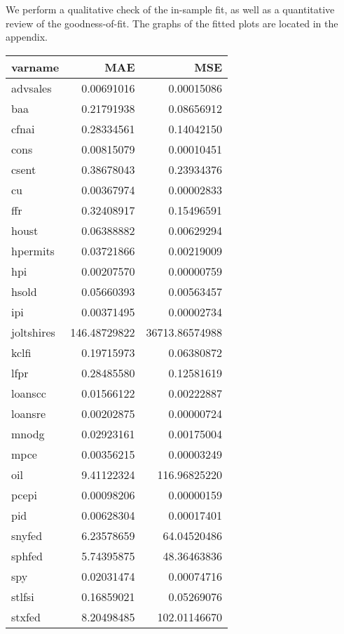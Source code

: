\documentclass[11pt, letterpaper]{article}\usepackage[]{graphicx}\usepackage[]{color}
\begin{document}
We perform a qualitative check of the in-sample fit, as well as a quantitative review of the goodness-of-fit. The graphs of the fitted plots are located in the appendix.
\begin{table}[H]
\centering
\begingroup\footnotesize
\begin{tabular}{lrr}
  \hline
varname & MAE & MSE \\ 
  \hline
advsales & 0.00691016 & 0.00015086 \\ 
  baa & 0.21791938 & 0.08656912 \\ 
  cfnai & 0.28334561 & 0.14042150 \\ 
  cons & 0.00815079 & 0.00010451 \\ 
  csent & 0.38678043 & 0.23934376 \\ 
  cu & 0.00367974 & 0.00002833 \\ 
  ffr & 0.32408917 & 0.15496591 \\ 
  houst & 0.06388882 & 0.00629294 \\ 
  hpermits & 0.03721866 & 0.00219009 \\ 
  hpi & 0.00207570 & 0.00000759 \\ 
  hsold & 0.05660393 & 0.00563457 \\ 
  ipi & 0.00371495 & 0.00002734 \\ 
  joltshires & 146.48729822 & 36713.86574988 \\ 
  kclfi & 0.19715973 & 0.06380872 \\ 
  lfpr & 0.28485580 & 0.12581619 \\ 
  loanscc & 0.01566122 & 0.00222887 \\ 
  loansre & 0.00202875 & 0.00000724 \\ 
  mnodg & 0.02923161 & 0.00175004 \\ 
  mpce & 0.00356215 & 0.00003249 \\ 
  oil & 9.41122324 & 116.96825220 \\ 
  pcepi & 0.00098206 & 0.00000159 \\ 
  pid & 0.00628304 & 0.00017401 \\ 
  snyfed & 6.23578659 & 64.04520486 \\ 
  sphfed & 5.74395875 & 48.36463836 \\ 
  spy & 0.02031474 & 0.00074716 \\ 
  stlfsi & 0.16859021 & 0.05269076 \\ 
  stxfed & 8.20498485 & 102.01146670 \\ 

\end{tabular}
\end{table}
\end{document}
